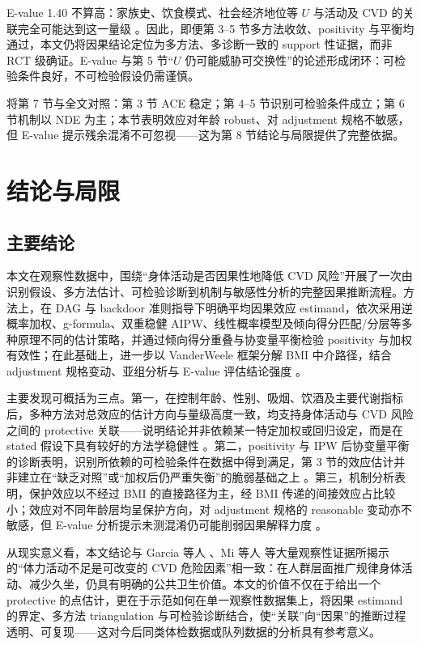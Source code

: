 \documentclass[12pt,a4paper]{article}
\begin{document}
E-value 1.40 不算高：家族史、饮食模式、社会经济地位等 $U$ 与活动及 CVD 的关联完全可能达到这一量级 \cite{mi2025creview,hernan2024whatif}。因此，即便第 3–5 节多方法收敛、positivity 与平衡均通过，本文仍将因果结论定位为多方法、多诊断一致的 support 性证据，而非 RCT 级确证。E-value 与第 5 节“$U$ 仍可能威胁可交换性”的论述形成闭环：可检验条件良好，不可检验假设仍需谨慎。

将第 7 节与全文对照：第 3 节 ACE 稳定；第 4–5 节识别可检验条件成立；第 6 节机制以 NDE 为主；本节表明效应对年龄 robust、对 adjustment 规格不敏感，但 E-value 提示残余混淆不可忽视——这为第 8 节结论与局限提供了完整依据。

\section{结论与局限}

\subsection{主要结论}

本文在观察性数据中，围绕“身体活动是否因果性地降低 CVD 风险”开展了一次由识别假设、多方法估计、可检验诊断到机制与敏感性分析的完整因果推断流程。方法上，在 DAG 与 backdoor 准则指导下明确平均因果效应 estimand，依次采用逆概率加权、g-formula、双重稳健 AIPW、线性概率模型及倾向得分匹配/分层等多种原理不同的估计策略，并通过倾向得分重叠与协变量平衡检验 positivity 与加权有效性；在此基础上，进一步以 VanderWeele 框架分解 BMI 中介路径，结合 adjustment 规格变动、亚组分析与 E-value 评估结论强度 \cite{hernan2024whatif,vanderweele2015explanation,vanderweele2017evalue}。

主要发现可概括为三点。第一，在控制年龄、性别、吸烟、饮酒及主要代谢指标后，多种方法对总效应的估计方向与量级高度一致，均支持身体活动与 CVD 风险之间的 protective 关联——说明结论并非依赖某一特定加权或回归设定，而是在 stated 假设下具有较好的方法学稳健性 \cite{shahu2023comparison}。第二，positivity 与 IPW 后协变量平衡的诊断表明，识别所依赖的可检验条件在数据中得到满足，第 3 节的效应估计并非建立在“缺乏对照”或“加权后仍严重失衡”的脆弱基础之上 \cite{chen2024iptw,rosenbaum1983central}。第三，机制分析表明，保护效应以不经过 BMI 的直接路径为主，经 BMI 传递的间接效应占比较小；效应对不同年龄层均呈保护方向，对 adjustment 规格的 reasonable 变动亦不敏感，但 E-value 分析提示未测混淆仍可能削弱因果解释力度 \cite{vanderweele2017evalue}。

从现实意义看，本文结论与 Garcia 等人 \cite{garcia2023meta}、Mi 等人 \cite{mi2025creview} 等大量观察性证据所揭示的“体力活动不足是可改变的 CVD 危险因素”相一致：在人群层面推广规律身体活动、减少久坐，仍具有明确的公共卫生价值。本文的价值不仅在于给出一个 protective 的点估计，更在于示范如何在单一观察性数据集上，将因果 estimand 的界定、多方法 triangulation 与可检验诊断结合，使“关联”向“因果”的推断过程透明、可复现——这对今后同类体检数据或队列数据的分析具有参考意义。
\end{document}
